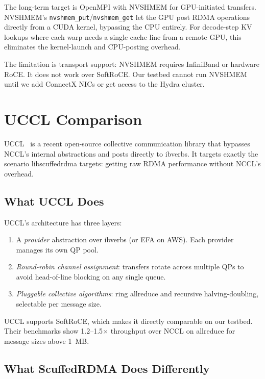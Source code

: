\documentclass[11pt,letterpaper]{article}
\begin{document}
The long-term target is OpenMPI with NVSHMEM for GPU-initiated transfers. NVSHMEM's \texttt{nvshmem\_put}/\texttt{nvshmem\_get} let the GPU post RDMA operations directly from a CUDA kernel, bypassing the CPU entirely. For decode-step KV lookups where each warp needs a single cache line from a remote GPU, this eliminates the kernel-launch and CPU-posting overhead.

The limitation is transport support: NVSHMEM requires InfiniBand or hardware RoCE. It does not work over SoftRoCE. Our testbed cannot run NVSHMEM until we add ConnectX NICs or get access to the Hydra cluster.

\section{UCCL Comparison}
\label{sec:uccl}

UCCL~\cite{uccl2026} is a recent open-source collective communication library that bypasses NCCL's internal abstractions and posts directly to ibverbs. It targets exactly the scenario libscuffedrdma targets: getting raw RDMA performance without NCCL's overhead.

\subsection{What UCCL Does}

UCCL's architecture has three layers:
\begin{enumerate}
\item A \emph{provider} abstraction over ibverbs (or EFA on AWS). Each provider manages its own QP pool.
\item \emph{Round-robin channel assignment}: transfers rotate across multiple QPs to avoid head-of-line blocking on any single queue.
\item \emph{Pluggable collective algorithms}: ring allreduce and recursive halving-doubling, selectable per message size.
\end{enumerate}

UCCL supports SoftRoCE, which makes it directly comparable on our testbed. Their benchmarks show 1.2--1.5$\times$ throughput over NCCL on allreduce for message sizes above 1~MB.

\subsection{What ScuffedRDMA Does Differently}
\end{document}
